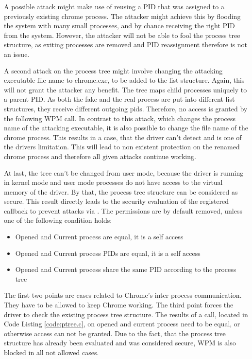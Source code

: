 A possible attack might make use of reusing a \gls{PID} that was assigned to a previously existing chrome process. The attacker might achieve this by flooding the system with many small processes, and by chance receiving the right \gls{PID} from the system. However, the attacker will not be able to fool the process tree structure, as exiting processes are removed and \gls{PID} reassignment therefore is not an issue. 

A second attack on the process tree might involve changing the attacking executable file name to chrome.exe, to be added to the list structure. Again, this will not grant the attacker any benefit. The tree maps child processes uniquely to a parent \gls{PID}. As both the fake and the real process are put into different list structures, they receive different outgoing pids. Therefore, no access is granted by the following \gls{WPM} call. In contrast to this attack, which changes the process name of the attacking executable, it is also possible to change the file name of the chrome process. This results in a case, that the driver can't detect and is one of the drivers limitation. This will lead to non existent protection on the renamed chrome process and therefore all given attacks continue working.

At last, the tree can't be changed from user mode, because the driver is running in kernel mode and user mode processes do not have access to the virtual memory of the driver. By that, the process tree structure can be considered as secure. This result directly leads to the security evaluation of the registered callback to prevent attacks via . The permissions are by default removed, unless one of the following condition holds:
\begin{itemize}
\item Opened and Current process are equal, it is a self access
\item Opened and Current process \glspl{PID} are equal, it is a self access
\item Opened and Current process share the same \gls{PID} according to the process tree
\end{itemize}
The first two points are cases related to Chrome's inter process communication. They have to be allowed to keep Chrome working. The third point forces the driver to check the existing process tree structure. The results of a  call, located in Code Listing \ref{code:ptree.c}, on opened and current process need to be equal, or otherwise access can not be granted. Due to the fact, that the process tree structure has already been evaluated and was considered secure, \gls{WPM} is also blocked in all not allowed cases. 

